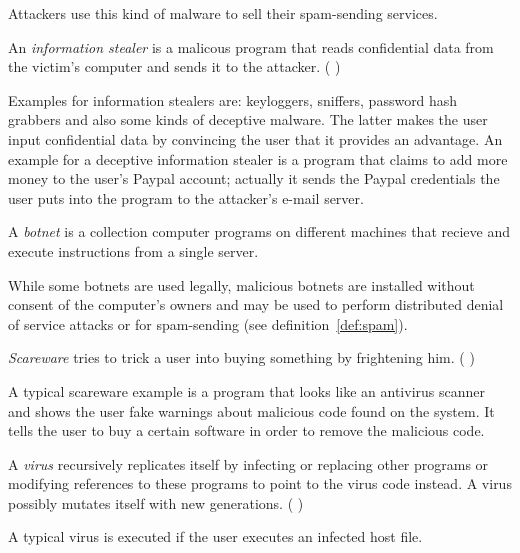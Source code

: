 Attackers use this kind of malware to sell their spam-sending services.

\begin{definition}
An \emph{information stealer} is a malicous program that reads confidential data from the victim's computer and sends it to the attacker. (\cf{} \cite[]{sikorski12})
\end{definition} 

Examples for information stealers are: keyloggers, sniffers, password hash grabbers \cite[]{sikorski12} and also some kinds of deceptive malware. The latter makes the user input confidential data by convincing the user that it provides an advantage. An example for a deceptive information stealer is a program that claims to add more money to the user's Paypal account; actually it sends the Paypal credentials the user puts into the program to the attacker's e-mail server.

\begin{definition}[Botnet]
A \emph{botnet} is a collection computer programs on different machines that recieve and execute instructions from a single server.
\end{definition} 

While some botnets are used legally, malicious botnets are installed without consent of the computer's owners and may be used to perform distributed denial of service attacks or for spam-sending (see definition~\ref{def:spam}).

\begin{definition}[Scareware]
\emph{Scareware} tries to trick a user into buying something by frightening him. (\cf{} \cite[]{sikorski12})
\end{definition} 

A typical scareware example is a program that looks like an antivirus scanner and shows the user fake warnings about malicious code found on the system. It tells the user to buy a certain software in order to remove the malicious code.

\begin{definition}[Virus]
A \emph{virus} recursively replicates itself by infecting or replacing other programs or modifying references to these programs to point to the virus code instead. A virus possibly mutates itself with new generations. (\cf{} \cite[]{szor05})
\end{definition} 

A typical virus is executed if the user executes an infected host file.

